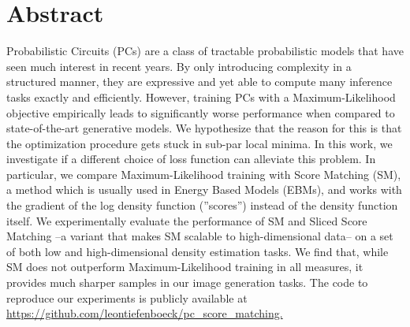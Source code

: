 \chapter{Abstract}

Probabilistic Circuits (PCs) are a class of tractable 
probabilistic models that have seen much interest in recent years. 
By only introducing complexity in a structured manner, they are expressive 
and yet able to compute many inference tasks exactly and efficiently.
However, training PCs with a Maximum-Likelihood objective empirically leads to significantly
worse performance when compared to state-of-the-art generative models. 
We hypothesize that the reason for this is that the optimization procedure gets stuck in sub-par 
local minima. In this work, we investigate if a different choice of loss function 
can alleviate this problem. In particular, we compare Maximum-Likelihood training 
with Score Matching (SM), a method which is usually used in Energy Based Models (EBMs), 
and works with the gradient of the log density function (”scores”) instead of the density function itself.
We experimentally evaluate the performance of SM and Sliced Score Matching --a variant that makes SM
scalable to high-dimensional data-- on a set of both low and high-dimensional density 
estimation tasks. We find that, while SM does not outperform Maximum-Likelihood training in all 
measures, it provides much sharper samples in our image generation tasks.
The code to reproduce our experiments is publicly available at \url{https://github.com/leontiefenboeck/pc\_score\_matching.}
